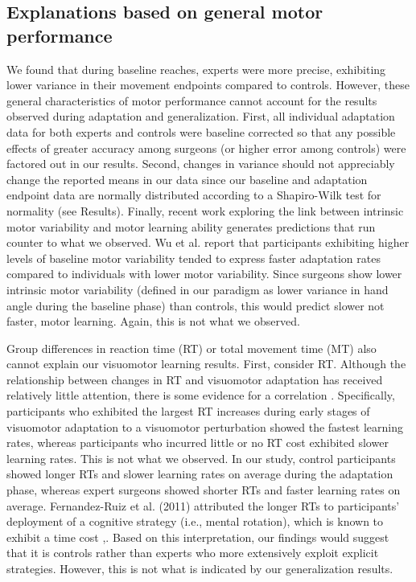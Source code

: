 \documentclass[jou, 11pt, longtable, floatsintext, notab]{apa6}
\begin{document}
\subsection{Explanations based on general motor performance}
We found that during baseline reaches, experts were more
precise, exhibiting lower variance in their movement
endpoints compared to controls. However, these general
characteristics of motor performance cannot account for the
results observed during adaptation and generalization.
First, all individual adaptation data for both experts and
controls were baseline corrected so that any possible
effects of greater accuracy among surgeons (or higher error
among controls) were factored out in our results. Second,
changes in variance should not appreciably change the
reported means in our data since our baseline and adaptation
endpoint data are normally distributed according to a
Shapiro-Wilk test for normality (see Results). Finally,
recent work exploring the link between intrinsic motor
variability and motor learning ability
\cite{anguera_failure_2011} generates predictions that run
counter to what we observed. Wu et al. report that
participants exhibiting higher levels of baseline motor
variability tended to express faster adaptation rates
compared to individuals with lower motor variability. Since
surgeons show lower intrinsic motor variability (defined in
our paradigm as lower variance in hand angle during the
baseline phase) than controls, this would predict slower not
faster, motor learning. Again, this is not what we observed.

Group differences in reaction time (RT) or total movement
time (MT) also cannot explain our visuomotor learning
results. First, consider RT. Although the relationship
between changes in RT and visuomotor adaptation has received
relatively little attention, there is some evidence for a
correlation \cite{anguera_contributions_2010}. Specifically,
participants who exhibited the largest RT increases during
early stages of visuomotor adaptation to a visuomotor
perturbation showed the fastest learning rates, whereas
participants who incurred little or no RT cost exhibited
slower learning rates. This is not what we observed. In our
study, control participants showed longer RTs and slower
learning rates on average during the adaptation phase,
whereas expert surgeons showed shorter RTs and faster
learning rates on average. Fernandez-Ruiz et al. (2011)
attributed the longer RTs to participants’ deployment of a
cognitive strategy (i.e., mental rotation), which is known
to exhibit a time cost \cite{mackenzie_movement_1995},\cite{green_action_2003}.
Based on this interpretation, our findings would suggest
that it is controls rather than experts who more extensively
exploit explicit strategies. However, this is not what is
indicated by our generalization results.
\end{document}
